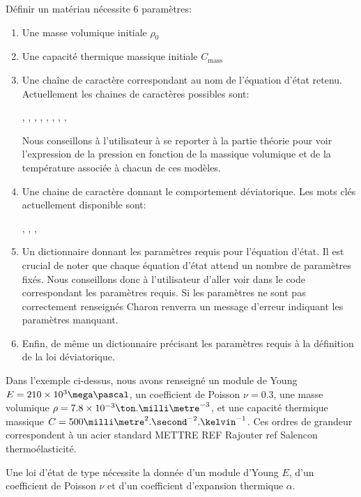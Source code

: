 \documentclass[10pt]{book}
\begin{document}
\begin{figure}[h!]

\end{figure}
Définir un matériau nécessite 6 paramètres:
\begin{enumerate}
\item Une masse volumique initiale $\rho_{0}$
\item Une capacité thermique massique initiale $C_{\mathrm{mass}}$
\item Une chaîne de caractère correspondant au nom de l'équation d'état retenu. Actuellement les chaines de caractères possibles sont:
\begin{center}
, , , , , , , , 
\end{center}
Nous conseillons à l'utilisateur à se reporter à la partie théorie pour voir l'expression de la pression en fonction de la massique volumique et de la température associée à chacun de ces modèles.
\item Une chaine de caractère donnant le comportement déviatorique. Les mots clés actuellement disponible sont:
\begin{center}
, , , 
\end{center}
\item Un dictionnaire donnant les paramètres requis pour l'équation d'état. Il est crucial de noter que chaque équation d'état attend un nombre de paramètres fixés. Nous conseillons donc à l'utilisateur d'aller voir dans le code correspondant les paramètres requis. Si les paramètres ne sont pas correctement renseignés Charon renverra un message d'erreur indiquant les paramètres manquant.
\item Enfin, de même un dictionnaire précisant les paramètres requis à la définition de la loi déviatorique.
\end{enumerate}
Dans l'exemple ci-dessus, nous avons renseigné un module de Young $E=210 \times 10^3 \mega\pascal$, un coefficient de Poisson $\nu=0.3$, une masse volumique $\rho = 7.8 \times 10^{-3} \ton.\milli\metre^{-3}$, et une capacité thermique massique $C=500 \milli\metre^{2}.\second^{-2}.\kelvin^{-1}$. Ces ordres de grandeur correspondent à un acier standard METTRE REF Rajouter ref Salencon thermoélasticité.

Une loi d'état de type  nécessite la donnée d'un module d'Young $E$, d'un coefficient de Poisson $\nu$ et d'un coefficient d'expansion thermique $\alpha$.
\end{document}
